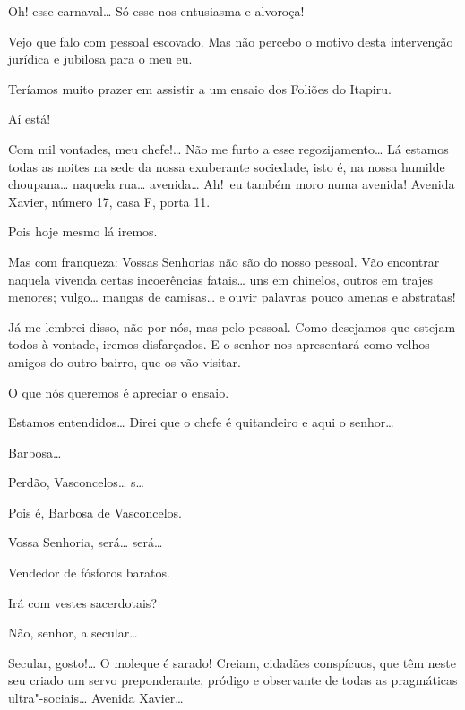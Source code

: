   
Oh! esse carnaval\ldots{} Só esse nos
entusiasma e alvoroça!

 Vejo que falo
com pessoal escovado. Mas não percebo o motivo desta
intervenção jurídica e jubilosa para o meu eu.

 Teríamos muito
prazer em assistir a um ensaio dos Foliões
do Itapiru.

 Aí está!

 Com mil
vontades, meu chefe!\ldots{} Não me furto a esse
regozijamento\ldots{} Lá estamos todas as noites na sede
da nossa exuberante sociedade, isto é, na nossa
humilde choupana\ldots{} naquela rua\ldots{} avenida\ldots{} Ah!~eu também
moro numa avenida! Avenida Xavier, número
17, casa F, porta 11.

 Pois hoje mesmo lá
iremos.

 Mas com
franqueza: Vossas Senhorias não são do nosso pessoal.
Vão encontrar naquela vivenda certas
incoerências fatais\ldots{} uns em chinelos, outros em
trajes menores; vulgo\ldots{} mangas de camisas\ldots{} e ouvir palavras pouco
amenas e abstratas!

 Já me lembrei
disso, não por nós, mas pelo pessoal. Como desejamos
que estejam todos à vontade, iremos
disfarçados. E o senhor nos apresentará
como velhos amigos do outro bairro, que os vão
visitar.

 O que nós queremos é
apreciar o ensaio.

 Estamos
entendidos\ldots{} Direi que o chefe é quitandeiro e aqui
o senhor\ldots

  
Barbosa\ldots

 Perdão,
Vasconcelos\ldots{} s\ldots

 
Pois é, Barbosa de
Vasconcelos.

 Vossa Senhoria,
será\ldots{} será\ldots

 Vendedor de fósforos baratos.

 Irá com vestes
sacerdotais?

 Não, senhor, a secular\ldots

 Secular,
gosto!\ldots{} O moleque é sarado! 
Creiam, cidadães conspícuos,
que têm neste seu criado um servo
preponderante, pródigo e observante de todas as
pragmáticas ultra"-sociais\ldots{} Avenida Xavier\ldots

